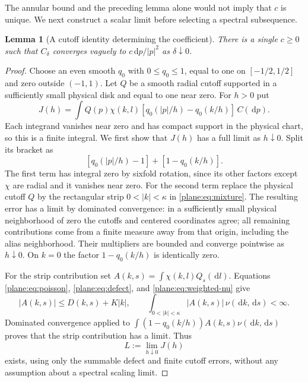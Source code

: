 \documentclass[11pt]{article}
\newtheorem{lemma}[theorem]{Lemma}
\theoremstyle{definition}
\theoremstyle{remark}
\numberwithin{equation}{section}
\begin{document}
The annular bound and the preceding lemma alone would not imply that
$c$ is unique.  We next construct a scalar limit before selecting a
spectral subsequence.

\begin{lemma}[A cutoff identity determining the coefficient]
\label{plane:lem:unique}
There is a single $c\ge0$ such that $C_\delta$ converges vaguely to
$c\,\mathrm d p/|p|^2$ as $\delta\downarrow0$.
\end{lemma}

\begin{proof}
Choose an even smooth $q_0$ with $0\le q_0\le1$, equal to one on
$[-1/2,1/2]$ and zero outside $(-1,1)$.  Let $Q$ be a smooth radial
cutoff supported in a sufficiently small physical disk and equal to
one near zero.  For $h>0$ put
\begin{equation}
 \label{plane:eq:cutoff}
 J(h)=\int Q(p)\chi(k,l)
       [q_0(|p|/h)-q_0(k/h)]\,C(\,\mathrm d p).
\end{equation}
Each integrand vanishes near zero and has compact support in the
physical chart, so this is a finite integral.
We first show that $J(h)$ has a full limit as $h\downarrow0$.
Split its bracket as
\[
 [q_0(|p|/h)-1]+[1-q_0(k/h)].
\]
The first term has integral zero by sixfold rotation, since its other
factors except $\chi$ are radial and it vanishes near zero.
For the second term replace the physical cutoff $Q$ by the rectangular
strip $0<|k|<\kappa$ in \eqref{plane:eq:mixture}.  The resulting error
has a limit by dominated convergence: in a sufficiently small physical
neighborhood of zero the cutoffs and centered coordinates agree;
all remaining contributions come from a finite measure away from
that origin, including the alias neighborhood.  Their multipliers
are bounded and converge pointwise as $h\downarrow0$.  On $k=0$
the factor $1-q_0(k/h)$ is identically zero.

For the strip contribution set
$A(k,s)=\int\chi(k,l)Q_s(\,\mathrm d l)$.  Equations
\eqref{plane:eq:poisson}, \eqref{plane:eq:defect}, and
\eqref{plane:eq:weighted-nu} give
\[
 |A(k,s)|\le D(k,s)+K|k|,
 \qquad
 \int_{0<|k|<\kappa}|A(k,s)|\,\nu(\,\mathrm d k,\,\mathrm d s)<\infty.
\]
Dominated convergence applied to
$\int(1-q_0(k/h))A(k,s)\nu(\,\mathrm d k,\,\mathrm d s)$ proves that the strip
contribution has a limit.  Thus
\begin{equation}
 \label{plane:eq:cutoff-full-limit}
 L:=\lim_{h\downarrow0}J(h)
\end{equation}
exists, using only the summable defect and finite cutoff errors,
without any assumption about a spectral scaling limit.


\end{proof}
\end{document}
